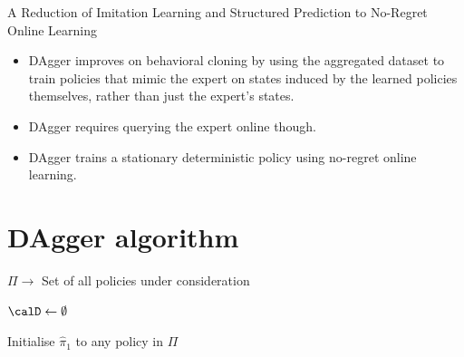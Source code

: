 

A Reduction of Imitation Learning and Structured Prediction to No-Regret Online Learning

\begin{itemize}
    \item DAgger improves on behavioral cloning by using the aggregated dataset to train policies that mimic the expert on states induced by the learned policies themselves, rather than just the expert's states.

    \item DAgger requires querying the expert online though.

    \item DAgger trains a stationary deterministic policy using no-regret online learning.
\end{itemize}

\section{DAgger algorithm}

\( \Pi \to \) Set of all policies under consideration

\begin{algorithm}[H]
    \caption{
        DAgger algorithm
    }\label{alg:DAgger}
    \SetAlgoLined{}

    \( \calD \leftarrow \emptyset \)\;

    Initialise \( \hat{\pi}_1 \) to any policy in \( \Pi \)\;

    \;
\end{algorithm}

